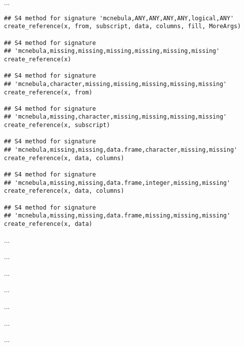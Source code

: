 \documentclass[letterpaper]{book}
\begin{document}
%
\begin{Description}\relax
...
\end{Description}
%
\begin{Usage}
\begin{verbatim}
## S4 method for signature 'mcnebula,ANY,ANY,ANY,ANY,logical,ANY'
create_reference(x, from, subscript, data, columns, fill, MoreArgs)

## S4 method for signature 
## 'mcnebula,missing,missing,missing,missing,missing,missing'
create_reference(x)

## S4 method for signature 
## 'mcnebula,character,missing,missing,missing,missing,missing'
create_reference(x, from)

## S4 method for signature 
## 'mcnebula,missing,character,missing,missing,missing,missing'
create_reference(x, subscript)

## S4 method for signature 
## 'mcnebula,missing,missing,data.frame,character,missing,missing'
create_reference(x, data, columns)

## S4 method for signature 
## 'mcnebula,missing,missing,data.frame,integer,missing,missing'
create_reference(x, data, columns)

## S4 method for signature 
## 'mcnebula,missing,missing,data.frame,missing,missing,missing'
create_reference(x, data)
\end{verbatim}
\end{Usage}
%
\begin{Arguments}
\begin{ldescription}
\item[\code{x}] ...

\item[\code{from}] ...

\item[\code{subscript}] ...

\item[\code{data}] ...

\item[\code{columns}] ...

\item[\code{fill}] ...

\item[\code{MoreArgs}] ...
\end{ldescription}
\end{Arguments}
\end{document}
